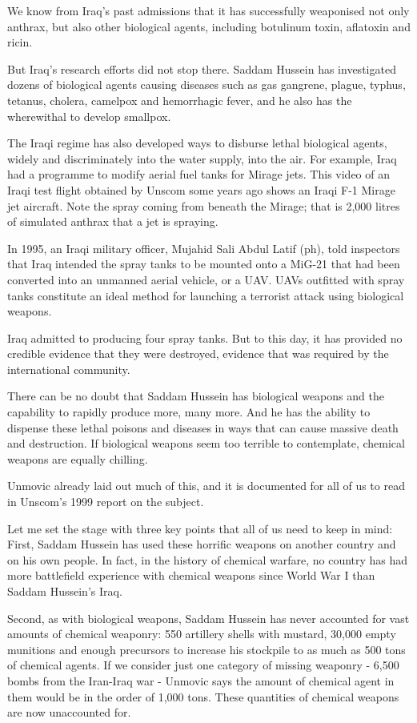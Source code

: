 \documentclass[10pt,a4paper]{article}
\begin{document}
We know from Iraq's past admissions that it has successfully weaponised not only anthrax, but also other biological agents, including botulinum toxin, aflatoxin and ricin.

But Iraq's research efforts did not stop there. Saddam Hussein has investigated dozens of biological agents causing diseases such as gas gangrene, plague, typhus, tetanus, cholera, camelpox and hemorrhagic fever, and he also has the wherewithal to develop smallpox.

The Iraqi regime has also developed ways to disburse lethal biological agents, widely and discriminately into the water supply, into the air. For example, Iraq had a programme to modify aerial fuel tanks for Mirage jets. This video of an Iraqi test flight obtained by Unscom some years ago shows an Iraqi F-1 Mirage jet aircraft. Note the spray coming from beneath the Mirage; that is 2,000 litres of simulated anthrax that a jet is spraying.

In 1995, an Iraqi military officer, Mujahid Sali Abdul Latif (ph), told inspectors that Iraq intended the spray tanks to be mounted onto a MiG-21 that had been converted into an unmanned aerial vehicle, or a UAV. UAVs outfitted with spray tanks constitute an ideal method for launching a terrorist attack using biological weapons.

Iraq admitted to producing four spray tanks. But to this day, it has provided no credible evidence that they were destroyed, evidence that was required by the international community.

There can be no doubt that Saddam Hussein has biological weapons and the capability to rapidly produce more, many more. And he has the ability to dispense these lethal poisons and diseases in ways that can cause massive death and destruction. If biological weapons seem too terrible to contemplate, chemical weapons are equally chilling.

Unmovic already laid out much of this, and it is documented for all of us to read in Unscom's 1999 report on the subject.

Let me set the stage with three key points that all of us need to keep in mind: First, Saddam Hussein has used these horrific weapons on another country and on his own people. In fact, in the history of chemical warfare, no country has had more battlefield experience with chemical weapons since World War I than Saddam Hussein's Iraq.

Second, as with biological weapons, Saddam Hussein has never accounted for vast amounts of chemical weaponry: 550 artillery shells with mustard, 30,000 empty munitions and enough precursors to increase his stockpile to as much as 500 tons of chemical agents. If we consider just one category of missing weaponry - 6,500 bombs from the Iran-Iraq war - Unmovic says the amount of chemical agent in them would be in the order of 1,000 tons. These quantities of chemical weapons are now unaccounted for.
\end{document}
